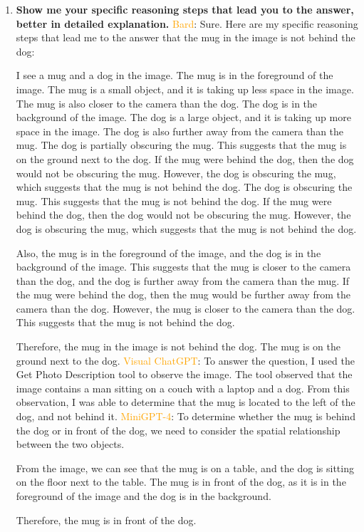 \begin{enumerate}
    Therefore, the mug in the image is not behind the dog. The mug is on the ground next to the dog.
    \subitem \textcolor{orange}{Visual ChatGPT}: The mug is located to the left of the dog, not behind it.
    \subitem \textcolor{orange}{MiniGPT-4}: No, the mug is not behind the dog. It is in front of the dog, on a table in front of the dog.
    \item \textbf{Show me your specific reasoning steps that lead you to the answer, better in detailed explanation.}
    \subitem \textcolor{orange}{Bard}: 
    Sure. Here are my specific reasoning steps that lead me to the answer that the mug in the image is not behind the dog:
    
    I see a mug and a dog in the image.
    The mug is in the foreground of the image. The mug is a small object, and it is taking up less space in the image. The mug is also closer to the camera than the dog.
    The dog is in the background of the image. The dog is a large object, and it is taking up more space in the image. The dog is also further away from the camera than the mug.
    The dog is partially obscuring the mug. This suggests that the mug is on the ground next to the dog.
    If the mug were behind the dog, then the dog would not be obscuring the mug. However, the dog is obscuring the mug, which suggests that the mug is not behind the dog.
    The dog is obscuring the mug. This suggests that the mug is not behind the dog. If the mug were behind the dog, then the dog would not be obscuring the mug. However, the dog is obscuring the mug, which suggests that the mug is not behind the dog.
    
    Also, the mug is in the foreground of the image, and the dog is in the background of the image. This suggests that the mug is closer to the camera than the dog, and the dog is further away from the camera than the mug. If the mug were behind the dog, then the mug would be further away from the camera than the dog. However, the mug is closer to the camera than the dog. This suggests that the mug is not behind the dog.
    
    Therefore, the mug in the image is not behind the dog. The mug is on the ground next to the dog.
    \subitem \textcolor{orange}{Visual ChatGPT}: To answer the question, I used the Get Photo Description tool to observe the image. The tool observed that the image contains a man sitting on a couch with a laptop and a dog. From this observation, I was able to determine that the mug is located to the left of the dog, and not behind it.
    \subitem \textcolor{orange}{MiniGPT-4}: To determine whether the mug is behind the dog or in front of the dog, we need to consider the spatial relationship between the two objects.

    From the image, we can see that the mug is on a table, and the dog is sitting on the floor next to the table. The mug is in front of the dog, as it is in the foreground of the image and the dog is in the background.
    
    Therefore, the mug is in front of the dog.
\end{enumerate}
